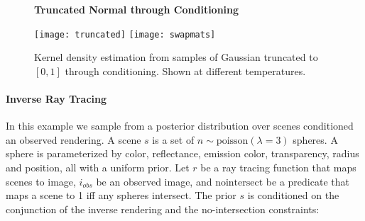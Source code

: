 \begin{figure}[!htb]
\centering
\textbf{Truncated Normal through Conditioning}\par\medskip
\texttt{[image: truncated]}
\texttt{[image: swapmats]}


	
	
	\caption{Kernel density estimation from samples of Gaussian truncated to $[0, 1]$ through conditioning. Shown at different temperatures.}
	\label{fig:density}
\end{figure}



\paragraph{Inverse Ray Tracing}
In this example we sample from a posterior distribution over scenes conditioned an observed rendering.  A scene $s$ is a set of $n \sim \textrm{poisson}(\lambda = 3)$ spheres.
A sphere is parameterized by color, reflectance, emission color, transparency, radius and position, all with a uniform prior.
Let $r$ be a ray tracing function that maps scenes to image, $i_{obs}$ be an observed image, and $\textrm{nointersect}$ be a predicate that maps a scene to 1 iff any spheres intersect.
The prior $s$ is conditioned on the conjunction of the inverse rendering and the no-intersection constraints:

